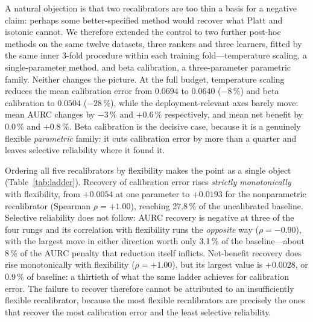 \documentclass[fleqn,10pt]{wlscirep}
\newcommand{\result}[1]{#1}
\begin{document}
A natural objection is that two recalibrators are too thin a basis for a negative claim: perhaps some
better-specified method would recover what Platt and isotonic cannot. We therefore extended the control
to two further post-hoc methods on the same twelve datasets, three rankers and three learners, fitted
by the same inner 3-fold procedure within each training fold---temperature scaling, a single-parameter
method, and beta calibration, a three-parameter parametric family. Neither changes the picture. At the
full budget, temperature scaling reduces the mean calibration error from \result{$0.0694$} to
\result{$0.0640$} (\result{$-8\,\%$}) and beta calibration to \result{$0.0504$} (\result{$-28\,\%$}),
while the deployment-relevant axes barely move: mean AURC changes by \result{$-3\,\%$} and
\result{$+0.6\,\%$} respectively, and mean net benefit by \result{$0.0\,\%$} and \result{$+0.8\,\%$}.
Beta calibration is the decisive case, because it is a genuinely flexible \emph{parametric} family: it
cuts calibration error by more than a quarter and leaves selective reliability where it found it.

Ordering all five recalibrators by flexibility makes the point as a single object
(Table~\ref{tab:ladder}). Recovery of calibration error rises \emph{strictly monotonically} with
flexibility, from \result{$+0.0054$} at one parameter to \result{$+0.0193$} for the nonparametric
recalibrator (Spearman \result{$\rho=+1.00$}), reaching \result{27.8\,\%} of the uncalibrated
baseline. Selective reliability does not follow: AURC recovery is negative at three of the four rungs
and its correlation with flexibility runs the \emph{opposite} way (\result{$\rho=-0.90$}), with the
largest move in either direction worth only \result{3.1\,\%} of the baseline---about
\result{8\,\%} of the AURC penalty that reduction itself inflicts. Net-benefit recovery does rise
monotonically with flexibility (\result{$\rho=+1.00$}), but its largest value is \result{$+0.0028$}, or \result{0.9\,\%} of baseline: a thirtieth of
what the same ladder achieves for calibration error. The failure to recover therefore cannot be
attributed to an insufficiently flexible recalibrator, because the most flexible recalibrators are
precisely the ones that recover the most calibration error and the least selective reliability.
\end{document}
